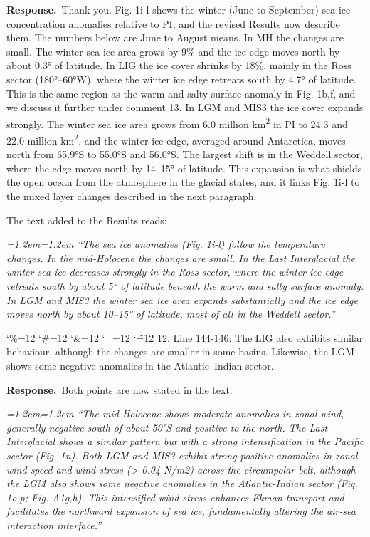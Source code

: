 \documentclass[11pt,a4paper]{article}
\newcommand{\comment}[1]{\par\medskip\noindent\color{black}\begingroup\catcode`\%=12 \catcode`\#=12 \catcode`\&=12 \catcode`\_=12 \catcode`\~=12 \commentbody}
\newcommand{\commentbody}[1]{#1\endgroup\par\smallskip}
\newcommand{\response}{\par\noindent\color{chgcol}\textbf{Response.}\ }
\newenvironment{change}{\par\smallskip\color{chgcol}\small\itshape\leftskip=1.2em\rightskip=1.2em\noindent\ignorespaces}{\par\smallskip}
\begin{document}
\response Thank you. Fig. 1i-l shows the winter (June to September) sea ice concentration anomalies relative to PI, and the revised Results now describe them. The numbers below are June to August means. In MH the changes are small. The winter sea ice area grows by 9\% and the ice edge moves north by about 0.3° of latitude. In LIG the ice cover shrinks by 18\%, mainly in the Ross sector (180°–60°W), where the winter ice edge retreats south by 4.7° of latitude. This is the same region as the warm and salty surface anomaly in Fig. 1b,f, and we discuss it further under comment 13. In LGM and MIS3 the ice cover expands strongly. The winter sea ice area grows from 6.0 million km\textsuperscript{2} in PI to 24.3 and 22.0 million km\textsuperscript{2}, and the winter ice edge, averaged around Antarctica, moves north from 65.9°S to 55.0°S and 56.0°S. The largest shift is in the Weddell sector, where the edge moves north by 14–15° of latitude. This expansion is what shields the open ocean from the atmosphere in the glacial states, and it links Fig. 1i-l to the mixed layer changes described in the next paragraph.

The text added to the Results reads:

\begin{change}
``The sea ice anomalies (Fig. 1i-l) follow the temperature changes. In the mid-Holocene the changes are small. In the Last Interglacial the winter sea ice decreases strongly in the Ross sector, where the winter ice edge retreats south by about 5° of latitude beneath the warm and salty surface anomaly. In LGM and MIS3 the winter sea ice area expands substantially and the ice edge moves north by about 10--15° of latitude, most of all in the Weddell sector.''
\end{change}


\comment{R1}{12. Line 144-146: The LIG also exhibits similar behaviour, although the changes are smaller in some basins. Likewise, the LGM shows some negative anomalies in the Atlantic–Indian sector.}

\response Both points are now stated in the text.

\begin{change}
``The mid-Holocene shows moderate anomalies in zonal wind, generally negative south of about 50°S and positive to the north. The Last Interglacial shows a similar pattern but with a strong intensification in the Pacific sector (Fig. 1n). Both LGM and MIS3 exhibit strong positive anomalies in zonal wind speed and wind stress (> 0.04 N/m2) across the circumpolar belt, although the LGM also shows some negative anomalies in the Atlantic-Indian sector (Fig. 1o,p; Fig. A1g,h). This intensified wind stress enhances Ekman transport and facilitates the northward expansion of sea ice, fundamentally altering the air-sea interaction interface.''
\end{change}
\end{document}
